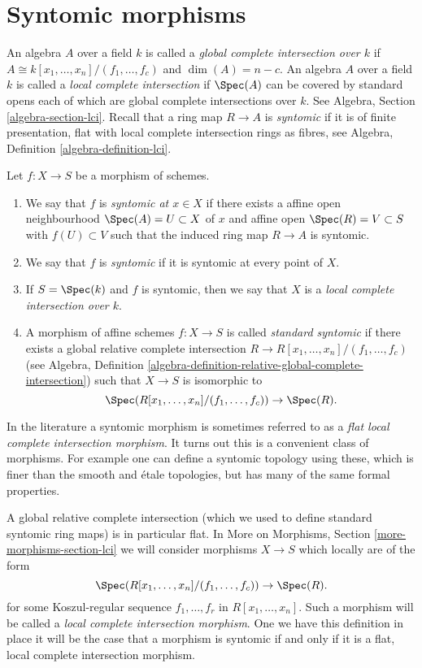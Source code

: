 \section{Syntomic morphisms}
\label{section-syntomic}

\noindent
An algebra $A$ over a field $k$ is called a
{\it global complete intersection over $k$}
if $A \cong k[x_1, \ldots, x_n]/(f_1, \ldots, f_c)$ and
$\dim(A) = n - c$. An algebra $A$ over a field $k$ is called a
{\it local complete intersection} if $\Spec(A)$
can be covered by standard opens each of which are global
complete intersections over $k$. See Algebra, Section
\ref{algebra-section-lci}. Recall that a ring map $R \to A$
is {\it syntomic} if it is of finite presentation,
flat with local complete intersection rings as fibres,
see Algebra, Definition \ref{algebra-definition-lci}.

\begin{definition}
\label{definition-syntomic}
Let $f : X \to S$ be a morphism of schemes.
\begin{enumerate}
\item We say that $f$ is {\it syntomic at $x \in X$} if
there exists a affine open neighbourhood $\Spec(A) = U \subset X$
of $x$ and affine open $\Spec(R) = V \subset S$
with $f(U) \subset V$ such that the induced ring map
$R \to A$ is syntomic.
\item We say that $f$ is {\it syntomic} if it is syntomic
at every point of $X$.
\item If $S = \Spec(k)$ and $f$ is syntomic, then we say that
$X$ is a {\it local complete intersection over $k$}.
\item A morphism of affine schemes $f : X \to S$
is called {\it standard syntomic} if there exists a
global relative complete intersection
$R \to R[x_1, \ldots, x_n]/(f_1, \ldots, f_c)$ (see
Algebra,
Definition \ref{algebra-definition-relative-global-complete-intersection})
such that $X \to S$ is isomorphic to
$$
\Spec(R[x_1, \ldots, x_n]/(f_1, \ldots, f_c)) \to \Spec(R).
$$
\end{enumerate}
\end{definition}

\noindent
In the literature a syntomic morphism is sometimes referred to as a
{\it flat local complete intersection morphism}.
It turns out this is a convenient class of morphisms. For example one
can define a syntomic topology using these, which is finer than the
smooth and \'etale topologies, but has many of the same formal properties.

\medskip\noindent
A global relative complete intersection (which we used to define standard
syntomic ring maps) is in particular flat. In
More on Morphisms, Section \ref{more-morphisms-section-lci}
we will consider morphisms $X \to S$ which locally are of the form
$$
\Spec(R[x_1, \ldots, x_n]/(f_1, \ldots, f_c)) \to \Spec(R).
$$
for some Koszul-regular sequence $f_1, \ldots, f_r$ in $R[x_1, \ldots, x_n]$.
Such a morphism will be called a {\it local complete intersection morphism}.
One we have this definition in place it will be the case that a morphism
is syntomic if and only if it is a flat, local complete intersection morphism.

